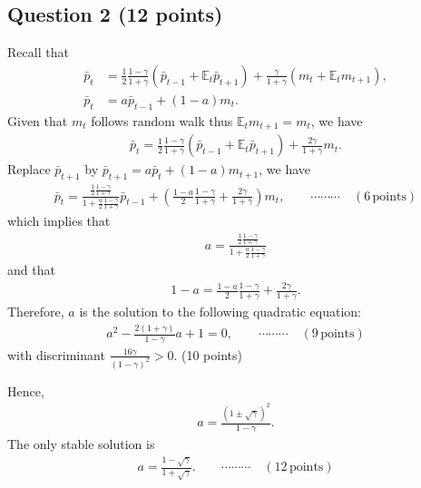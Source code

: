 \documentclass[12pt]{article}
\begin{document}
\subsection*{Question 2 (12 points)}
Recall that 
\begin{align*}
    \bar{p}_t &= \frac{1}{2} \frac{1-\gamma}{1+\gamma} (\bar{p}_{t-1} + \mathbb{E}_t\bar{p}_{t+1}) + \frac{\gamma}{1+\gamma} (m_t + \mathbb{E}_t m_{t+1}),\\
    \bar{p}_t &= a \bar{p}_{t-1} + (1-a) m_t.
\end{align*}
Given that $m_t$ follows random walk thus $\mathbb{E}_t m_{t+1} = m_t$, we have
\begin{align*}
    \bar{p}_t = \frac{1}{2} \frac{1-\gamma}{1+\gamma} (\bar{p}_{t-1} + \mathbb{E}_t \bar{p}_{t+1}) + \frac{2\gamma}{1+\gamma} m_t.
\end{align*}
Replace $\bar{p}_{t+1}$ by $\bar{p}_{t+1} = a\bar{p}_t + (1-a) m_{t+1}$, we have
\begin{align*}
    \bar{p}_t = \frac{\frac{1}{2} \frac{1-\gamma}{1+\gamma}}{1 + \frac{a}{2} \frac{1-\gamma}{1+\gamma}} \bar{p}_{t-1} + \left(\frac{1-a}{2} \frac{1-\gamma}{1+\gamma} + \frac{2\gamma}{1+\gamma}\right)m_t, \qquad \cdots\cdots\cdots \quad (6 \, \text{points})
\end{align*}
which implies that
\begin{align*}
    a = \frac{\frac{1}{2} \frac{1-\gamma}{1+\gamma}}{1 + \frac{a}{2} \frac{1-\gamma}{1+\gamma}}
\end{align*}
and that
\begin{align*}
    1-a = \frac{1-a}{2} \frac{1-\gamma}{1+\gamma} + \frac{2\gamma}{1+\gamma}.
\end{align*}
Therefore, $a$ is the solution to the following quadratic equation:
\begin{align*}
    a^2 - \frac{2(1+\gamma)}{1-\gamma} a + 1 = 0, \qquad \cdots\cdots\cdots \quad  (9 \, \text{points})
\end{align*}
with discriminant $\frac{16\gamma}{(1-\gamma)^2} > 0$. (10 points)

Hence,
\begin{align*}
    a = \frac{(1 \pm \sqrt{\gamma})^2}{1-\gamma}.
\end{align*}
The only stable solution is
\begin{align*}
    a = \frac{1-\sqrt{\gamma}}{1+\sqrt{\gamma}}. \qquad \cdots\cdots\cdots \quad  (12\, \text{points})
\end{align*}

\newpage
\end{document}
